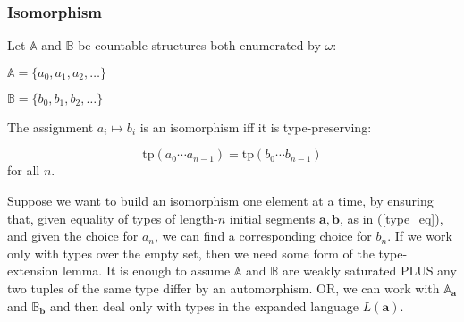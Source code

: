 \documentclass[t,xcolor=dvipsnames,handout]{beamer}
\theoremstyle{theoremFermat}
\theoremstyle{reimann}
\theoremstyle{ACExample}
\def\wec#1{{\mathbf #1}}
\begin{document}
\begin{frame} 
  \frametitle{Isomorphism}

  \pause
  Let $\mathbb A$ and $\mathbb B$ be countable structures
  both enumerated by $\omega$: \pause

$\mathbb A = \{a_0, a_1, a_2, \ldots\}$ \pause
 
$\mathbb B = \{b_0, b_1, b_2, \ldots\}$ \pause

  The assignment $a_i\mapsto b_i$ is an isomorphism iff it is type-preserving:
  \pause

  \begin{equation}\label{type_eq}
\textrm{tp}(a_0\cdots a_{n-1}) = \textrm{tp}(b_0\cdots b_{n-1}) 
  \end{equation}
  for all $n$.  \pause

  \bigskip

Suppose we want to build an isomorphism one element at a time,
by ensuring that, \pause
given equality of types of length-$n$
  initial segments $\wec{a}, \wec{b}$, as in (\ref{type_eq}),
  and given the choice for $a_n$, we can find
  a corresponding choice for $b_n$. \pause
  If we work only with types over the empty set,
  then we need some form of 
  the type-extension lemma. \pause
  It is enough to assume $\mathbb A$ and $\mathbb B$ are weakly
  saturated \pause
  PLUS any two tuples of the same type differ by an automorphism.
  \pause
  OR, we can work with $\mathbb A_{\wec{a}}$
  and $\mathbb B_{\wec{b}}$ and then deal only with types
  in the expanded language $L(\wec{a})$. \pause
  
\end{frame}
\end{document}
